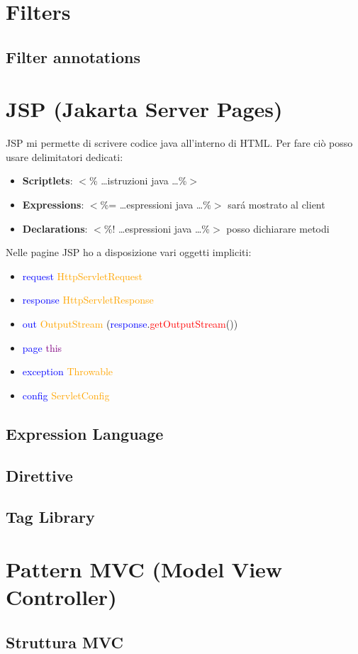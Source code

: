 \documentclass[11pt, letterpaper, titlepage]{article}
\begin{document}
\section{Filters}

\subsection{Filter annotations}

\section{JSP (Jakarta Server Pages)}
JSP mi permette di scrivere codice java all'interno di HTML. Per fare ci\`o posso
usare delimitatori dedicati:
\begin{itemize}
    \item \textbf{Scriptlets}: $<$\% \dots istruzioni java \dots \%$>$
    \item \textbf{Expressions}: $<$\%= \dots espressioni java \dots \%$>$ sar\'a mostrato al client
    \item \textbf{Declarations}: $<$\%! \dots espressioni java \dots \%$>$ posso dichiarare metodi
\end{itemize}
Nelle pagine JSP ho a disposizione vari oggetti impliciti:
\begin{itemize}
    \item \textcolor{blue}{request} \textcolor{orange}{HttpServletRequest}
    \item \textcolor{blue}{response} \textcolor{orange}{HttpServletResponse}
    \item \textcolor{blue}{out} \textcolor{orange}{OutputStream} (\textcolor{blue}{response}.\textcolor{red}{getOutputStream}())
    \item \textcolor{blue}{page} \textcolor{purple}{this}
    \item \textcolor{blue}{exception} \textcolor{orange}{Throwable}
    \item \textcolor{blue}{config} \textcolor{orange}{ServletConfig}
\end{itemize}

\subsection{Expression Language}

\subsection{Direttive}

\subsection{Tag Library}

\section{Pattern MVC (Model View Controller)}

\subsection{Struttura MVC}
\end{document}
